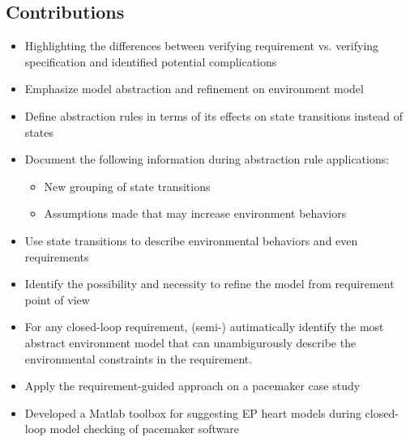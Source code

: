 \documentclass{llncs}
\begin{document}

\subsection{Contributions}
\begin{itemize}
	\item Highlighting the differences between verifying requirement vs. verifying specification and identified potential complications
    \item Emphasize model abstraction and refinement on environment model
    
    \item Define abstraction rules in terms of its effects on state transitions instead of states
    \item Document the following information during abstraction rule applications:
    
\begin{itemize}
	\item New grouping of state transitions
    \item Assumptions made that may increase environment behaviors
\end{itemize}
    \item Use state transitions to describe environmental behaviors and even requirements
    \item Identify the possibility and necessity to refine the model from requirement point of view
    \item For any closed-loop requirement, (semi-) autimatically identify the most abstract environment model that can unambigurously describe the environmental constraints in the requirement.
    \item Apply the requirement-guided approach on a pacemaker case study
    \item Developed a Matlab toolbox for suggesting EP heart models during closed-loop model checking of pacemaker software
\end{itemize}




\end{document}
